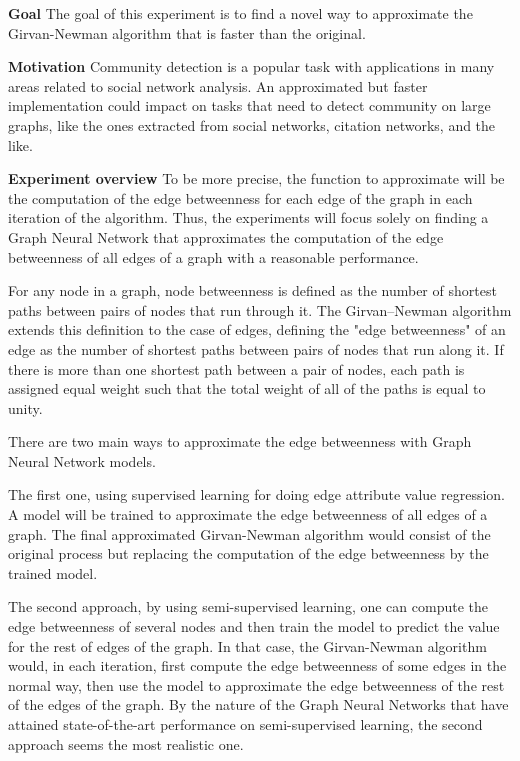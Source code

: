 \textbf{Goal}
The goal of this experiment is to find a novel way to approximate the Girvan-Newman algorithm that is faster than the original.


\textbf{Motivation}
Community detection is a popular task with applications in many areas related to social network analysis. An approximated but faster implementation could impact on tasks that need to detect community on large graphs, like the ones extracted from social networks, citation networks, and the like.


\textbf{Experiment overview}
To be more precise, the function to approximate will be the computation of the edge betweenness for each edge of the graph in each iteration of the algorithm. Thus, the experiments will focus solely on finding a Graph Neural Network that approximates the computation of the edge betweenness of all edges of a graph with a reasonable performance.

For any node in a graph, node betweenness is defined as the number of shortest paths between pairs of nodes that run through it. The Girvan–Newman algorithm extends this definition to the case of edges, defining the "edge betweenness" of an edge as the number of shortest paths between pairs of nodes that run along it. If there is more than one shortest path between a pair of nodes, each path is assigned equal weight such that the total weight of all of the paths is equal to unity.

There are two main ways to approximate the edge betweenness with Graph Neural Network models. 

The first one, using supervised learning for doing edge attribute value regression. A model will be trained to approximate the edge betweenness of all edges of a graph. The final approximated Girvan-Newman algorithm would consist of the original process but replacing the computation of the edge betweenness by the trained model.


The second approach, by using semi-supervised learning, one can compute the edge betweenness of several nodes and then train the model to predict the value for the rest of edges of the graph. In that case, the Girvan-Newman algorithm would, in each iteration, first compute the edge betweenness of some edges in the normal way, then use the model to approximate the edge betweenness of the rest of the edges of the graph. By the nature of the Graph Neural Networks that have attained state-of-the-art performance on semi-supervised learning, the second approach seems the most realistic one.

